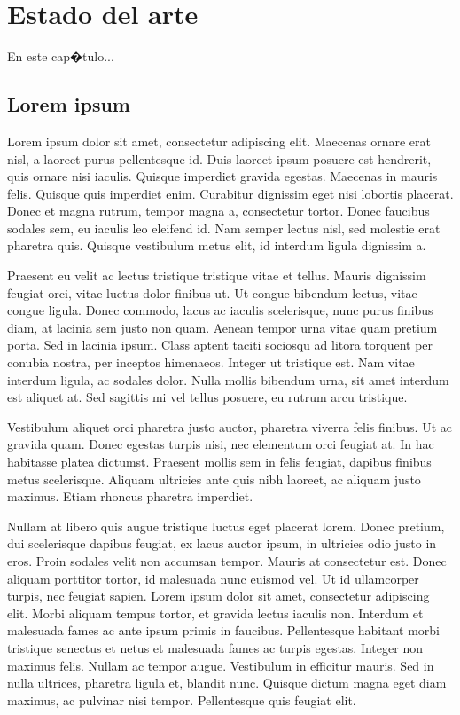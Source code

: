 \chapter{Estado del arte}

En este cap�tulo...


\section{Lorem ipsum}
Lorem ipsum dolor sit amet, consectetur adipiscing elit. Maecenas ornare erat nisl, a laoreet purus pellentesque id. Duis laoreet ipsum posuere est hendrerit, quis ornare nisi iaculis. Quisque imperdiet gravida egestas. Maecenas in mauris felis. Quisque quis imperdiet enim. Curabitur dignissim eget nisi lobortis placerat. Donec et magna rutrum, tempor magna a, consectetur tortor. Donec faucibus sodales sem, eu iaculis leo eleifend id. Nam semper lectus nisl, sed molestie erat pharetra quis. Quisque vestibulum metus elit, id interdum ligula dignissim a.

Praesent eu velit ac lectus tristique tristique vitae et tellus. Mauris dignissim feugiat orci, vitae luctus dolor finibus ut. Ut congue bibendum lectus, vitae congue ligula. Donec commodo, lacus ac iaculis scelerisque, nunc purus finibus diam, at lacinia sem justo non quam. Aenean tempor urna vitae quam pretium porta. Sed in lacinia ipsum. Class aptent taciti sociosqu ad litora torquent per conubia nostra, per inceptos himenaeos. Integer ut tristique est. Nam vitae interdum ligula, ac sodales dolor. Nulla mollis bibendum urna, sit amet interdum est aliquet at. Sed sagittis mi vel tellus posuere, eu rutrum arcu tristique.

Vestibulum aliquet orci pharetra justo auctor, pharetra viverra felis finibus. Ut ac gravida quam. Donec egestas turpis nisi, nec elementum orci feugiat at. In hac habitasse platea dictumst. Praesent mollis sem in felis feugiat, dapibus finibus metus scelerisque. Aliquam ultricies ante quis nibh laoreet, ac aliquam justo maximus. Etiam rhoncus pharetra imperdiet.

Nullam at libero quis augue tristique luctus eget placerat lorem. Donec pretium, dui scelerisque dapibus feugiat, ex lacus auctor ipsum, in ultricies odio justo in eros. Proin sodales velit non accumsan tempor. Mauris at consectetur est. Donec aliquam porttitor tortor, id malesuada nunc euismod vel. Ut id ullamcorper turpis, nec feugiat sapien. Lorem ipsum dolor sit amet, consectetur adipiscing elit. Morbi aliquam tempus tortor, et gravida lectus iaculis non. Interdum et malesuada fames ac ante ipsum primis in faucibus. Pellentesque habitant morbi tristique senectus et netus et malesuada fames ac turpis egestas. Integer non maximus felis. Nullam ac tempor augue. Vestibulum in efficitur mauris. Sed in nulla ultrices, pharetra ligula et, blandit nunc. Quisque dictum magna eget diam maximus, ac pulvinar nisi tempor. Pellentesque quis feugiat elit.

